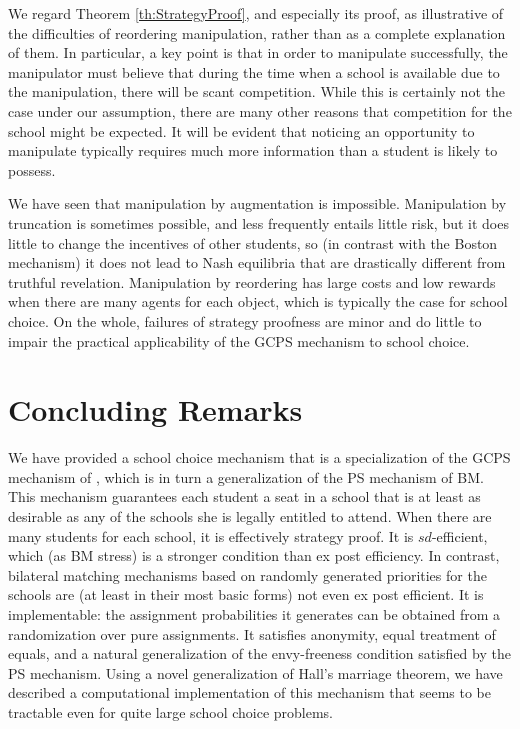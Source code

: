 \documentclass[12pt, A4paper]{article}
\theoremstyle{definition}
\begin{document}
We regard Theorem \ref{th:StrategyProof}, and especially its proof, as illustrative of the difficulties of reordering manipulation, rather than as a complete explanation of them.  In particular, a key point is that in order to manipulate successfully, the manipulator must believe that during the time when a school is available due to the manipulation, there will be scant competition.  While this is certainly not the case under our assumption, there are many other reasons that competition for the school might be expected.   It will be evident that noticing an opportunity to manipulate typically requires much more information than a student is likely to possess. 

We have seen that manipulation by augmentation is impossible.  Manipulation by truncation is sometimes possible, and less frequently entails little risk, but it does little to change the incentives of other students, so (in contrast with the Boston mechanism) it does not lead to Nash equilibria that are drastically different from truthful revelation.  Manipulation by reordering has large costs and low rewards when there are many agents for each object, which is typically the case for school choice.  On the whole, failures of strategy proofness are minor and do little to impair the practical applicability of the GCPS mechanism to school choice.

\section{Concluding Remarks} \label{sec:Conclusion}

We have provided a school choice mechanism that is a specialization of the GCPS mechanism of \cite{balbuzanov22jet}, which is in turn a generalization of the PS mechanism of BM.  This mechanism guarantees each student a seat in a school that is at least as desirable as any of the schools she is legally entitled to attend.  When there are many students for each school, it is effectively strategy proof.  It is $sd$-efficient, which (as BM stress) is a stronger condition than ex post efficiency.  In contrast, bilateral matching mechanisms based on randomly generated priorities for the schools are (at least in their most basic forms) not even ex post efficient.  It is implementable: the assignment probabilities it generates can be obtained from a randomization over pure assignments.  It satisfies anonymity, equal treatment of equals, and a natural generalization of the envy-freeness condition satisfied by the PS mechanism.
Using a novel generalization of Hall's marriage theorem, we have described a computational implementation of this mechanism that seems to be tractable even for quite large school choice problems. 
\end{document}
